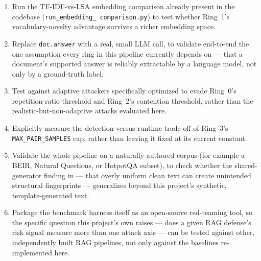\begin{enumerate}
\item Run the TF-IDF-vs-LSA embedding comparison already present in the
  codebase (\texttt{run\_\allowbreak embedding\_\allowbreak
  comparison.py}) to test whether Ring~1's vocabulary-novelty advantage
  survives a richer embedding space.
\item Replace \texttt{doc.answer} with a real, small LLM call, to
  validate end-to-end the one assumption every ring in this pipeline
  currently depends on --- that a document's supported answer is reliably
  extractable by a language model, not only by a ground-truth label.
\item Test against adaptive attackers specifically optimized to evade
  Ring~0's repetition-ratio threshold and Ring~2's contention threshold,
  rather than the realistic-but-non-adaptive attacks evaluated here.
\item Explicitly measure the detection-versus-runtime trade-off of
  Ring~3's \texttt{MAX\_PAIR\_SAMPLES} cap, rather than leaving it fixed
  at its current constant.
\item Validate the whole pipeline on a naturally authored corpus (for
  example a BEIR, Natural Questions, or HotpotQA subset), to check
  whether the shared-generator finding in  ---
  that overly uniform clean text can create unintended structural
  fingerprints --- generalizes beyond this project's synthetic,
  template-generated text.
\item Package the benchmark harness itself as an open-source
  red-teaming tool, so the specific question this project's own
   raises --- does a given RAG defense's risk signal
  measure more than one attack axis --- can be tested against other,
  independently built RAG pipelines, not only against the baselines
  re-implemented here.
\end{enumerate}
